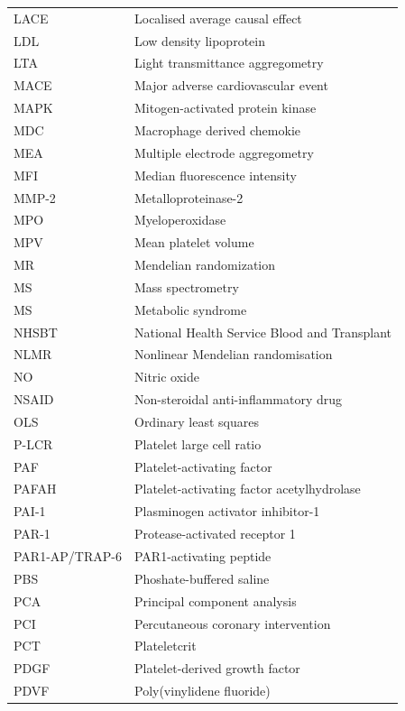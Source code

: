 \documentclass[11pt,twoside]{bristolthesis}
\begin{document}
\begin{abbreviations}
\begin{longtable}[t]{ll}
    \addlinespace
    LACE & Localised average causal effect\\
    LDL & Low density lipoprotein\\
    LTA & Light transmittance aggregometry\\
    MACE & Major adverse cardiovascular event\\
    MAPK & Mitogen-activated protein kinase\\
    \addlinespace
    MDC & Macrophage derived chemokie\\
    MEA & Multiple electrode aggregometry\\
    MFI & Median fluorescence intensity\\
    MMP-2 & Metalloproteinase-2\\
    MPO & Myeloperoxidase\\
    \addlinespace
    MPV & Mean platelet volume\\
    MR & Mendelian randomization\\
    MS & Mass spectrometry\\
    MS & Metabolic syndrome\\
    \addlinespace
    NHSBT & National Health Service Blood and Transplant\\
    NLMR & Nonlinear Mendelian randomisation\\
    NO & Nitric oxide\\
    NSAID & Non-steroidal anti-inflammatory drug\\
    OLS & Ordinary least squares\\
    \addlinespace
    P-LCR & Platelet large cell ratio\\
    PAF & Platelet-activating factor\\
    PAFAH & Platelet-activating factor acetylhydrolase\\
    PAI-1 & Plasminogen activator inhibitor-1\\
    PAR-1 & Protease-activated receptor 1\\
    PAR1-AP/TRAP-6 & PAR1-activating peptide\\
    PBS & Phoshate-buffered saline\\
    \addlinespace
    PCA & Principal component analysis\\
    PCI & Percutaneous coronary intervention\\
    PCT & Plateletcrit\\
    PDGF & Platelet-derived growth factor\\
    PDVF & Poly(vinylidene fluoride)\\

\end{longtable}
\end{abbreviations}
\end{document}
